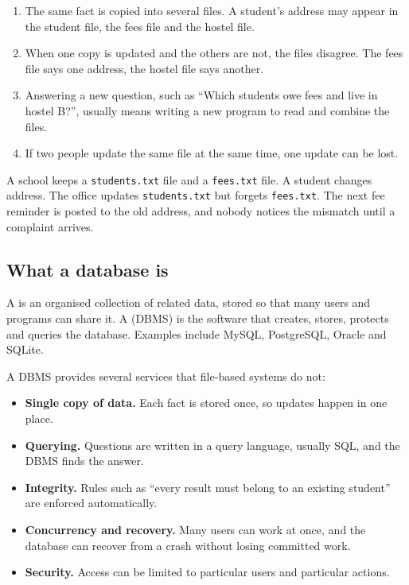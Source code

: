 \begin{enumerate}
  \item {} The same fact is copied into several files. A student's address may appear in the student file, the fees file and the hostel file.
  \item {} When one copy is updated and the others are not, the files disagree. The fees file says one address, the hostel file says another.
  \item {} Answering a new question, such as ``Which students owe fees and live in hostel B?'', usually means writing a new program to read and combine the files.
  \item {} If two people update the same file at the same time, one update can be lost.
\end{enumerate}

\begin{example}
A school keeps a \texttt{students.txt} file and a \texttt{fees.txt} file. A student changes address. The office updates \texttt{students.txt} but forgets \texttt{fees.txt}. The next fee reminder is posted to the old address, and nobody notices the mismatch until a complaint arrives.
\end{example}

\subsection{What a database is}

A  is an organised collection of related data, stored so that many users and programs can share it. A  (DBMS) is the software that creates, stores, protects and queries the database. Examples include MySQL, PostgreSQL, Oracle and SQLite.

A DBMS provides several services that file-based systems do not:
\begin{itemize}
  \item \textbf{Single copy of data.} Each fact is stored once, so updates happen in one place.
  \item \textbf{Querying.} Questions are written in a query language, usually SQL, and the DBMS finds the answer.
  \item \textbf{Integrity.} Rules such as ``every result must belong to an existing student'' are enforced automatically.
  \item \textbf{Concurrency and recovery.} Many users can work at once, and the database can recover from a crash without losing committed work.
  \item \textbf{Security.} Access can be limited to particular users and particular actions.
\end{itemize}

